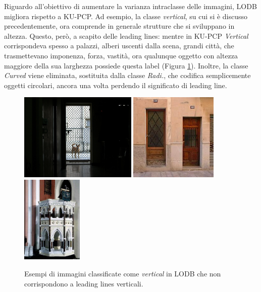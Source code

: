 Riguardo all'obiettivo di aumentare la varianza intraclasse delle immagini, LODB migliora rispetto a KU-PCP. Ad esempio, la classe \textit{vertical}, su cui si è discusso precedentemente, ora comprende in generale strutture che si sviluppano in altezza. Questo, però, a scapito delle leading lines: mentre in KU-PCP \textit{Vertical} corrispondeva spesso a palazzi, alberi uscenti dalla scena, grandi città, che trasmettevano imponenza, forza, vastità, ora qualunque oggetto con altezza maggiore della sua larghezza possiede questa label (Figura \ref{fig:lodb_vertical}). Inoltre, la classe \textit{Curved} viene eliminata, sostituita dalla classe \textit{Radi.}, che codifica semplicemente oggetti circolari, ancora una volta perdendo il significato di leading line. 

\begin{figure}[b]
    \centering
    \includegraphics[height=42mm]{Immagini/conclusioni/vertical1.jpg}
    \hspace{2mm}
    \includegraphics[height=42mm]{Immagini/conclusioni/vertical2.jpg}
    \hspace{2mm}
    \includegraphics[height=42mm]{Immagini/conclusioni/vertical3.jpg}
    \caption{Esempi di immagini classificate come \textit{vertical} in LODB che non corrispondono a leading lines verticali.}
    \label{fig:lodb_vertical}
\end{figure}


